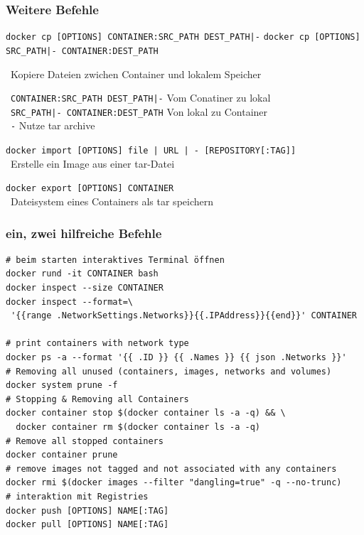 \documentclass[22pt]{beamer}
\newcommand{\code}[1]{\colorbox{gray!15}{\texttt{#1}}}
\begin{document}
\begin{frame}[fragile]
    \frametitle{Weitere Befehle}
    \code{docker cp [OPTIONS] CONTAINER:SRC\_PATH DEST\_PATH|-}
    \code{docker cp [OPTIONS] SRC\_PATH|- CONTAINER:DEST\_PATH}

    \- \ Kopiere Dateien zwichen Container und lokalem Speicher\vspace{5pt}

    \-  \ \code{CONTAINER:SRC\_PATH DEST\_PATH|-} Vom Conatiner zu lokal\\
    \-  \ \code{SRC\_PATH|- CONTAINER:DEST\_PATH} Von lokal zu Container\\
    \-  \ \code{-} Nutze tar archive
    \medskip\medskip
    
    \code{docker import [OPTIONS] file | URL | - [REPOSITORY[:TAG]]}\\
    \-  \ Erstelle ein Image aus einer tar-Datei  \medskip

    \code{docker export [OPTIONS] CONTAINER}\\
    \-  \ Dateisystem eines Containers als tar speichern \medskip

\end{frame}

\begin{frame}[fragile]
    \frametitle{ein, zwei hilfreiche Befehle}
    \begin{verbatim}
# beim starten interaktives Terminal öffnen
docker rund -it CONTAINER bash 
docker inspect --size CONTAINER
docker inspect --format=\
 '{{range .NetworkSettings.Networks}}{{.IPAddress}}{{end}}' CONTAINER

# print containers with network type
docker ps -a --format '{{ .ID }} {{ .Names }} {{ json .Networks }}'
# Removing all unused (containers, images, networks and volumes)
docker system prune -f
# Stopping & Removing all Containers
docker container stop $(docker container ls -a -q) && \
  docker container rm $(docker container ls -a -q)
# Remove all stopped containers
docker container prune
# remove images not tagged and not associated with any containers
docker rmi $(docker images --filter "dangling=true" -q --no-trunc)
# interaktion mit Registries
docker push [OPTIONS] NAME[:TAG]
docker pull [OPTIONS] NAME[:TAG]
    \end{verbatim}
\end{frame}
\end{document}
